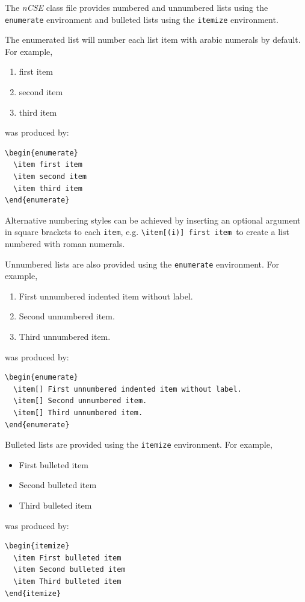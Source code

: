 \documentclass{nCSE2e}
\begin{document}
The {\it nCSE} class file provides numbered and unnumbered lists using the {\tt enumerate} environment and bulleted
lists  using the {\tt itemize} environment.

The enumerated list will number each list item with arabic numerals by default. For example,
%
\begin{enumerate}
  \item first item
  \item second item
  \item third item
\end{enumerate}
%
was produced by:
%
\begin{verbatim}
\begin{enumerate}
  \item first item
  \item second item
  \item third item
\end{enumerate}
\end{verbatim}
%
Alternative numbering styles can be achieved by inserting an optional argument in square brackets to each \verb"item", e.g. \verb"\item[(i)] first item"\, to create a list numbered with roman numerals.

Unnumbered lists are also provided using the {\tt enumerate} environment. For example,
%
\begin{enumerate}
  \item[] First unnumbered indented item without label.
  \item[] Second unnumbered item.
  \item[] Third unnumbered item.
\end{enumerate}
%
was produced by:
%
\begin{verbatim}
\begin{enumerate}
  \item[] First unnumbered indented item without label.
  \item[] Second unnumbered item.
  \item[] Third unnumbered item.
\end{enumerate}
\end{verbatim}

Bulleted lists are provided using the {\tt itemize} environment. For example,
\begin{itemize}
\item First bulleted item
\item Second bulleted item
\item Third bulleted item
\end{itemize}
was produced by:
\begin{verbatim}
\begin{itemize}
  \item First bulleted item
  \item Second bulleted item
  \item Third bulleted item
\end{itemize}
\end{verbatim}
\end{document}
